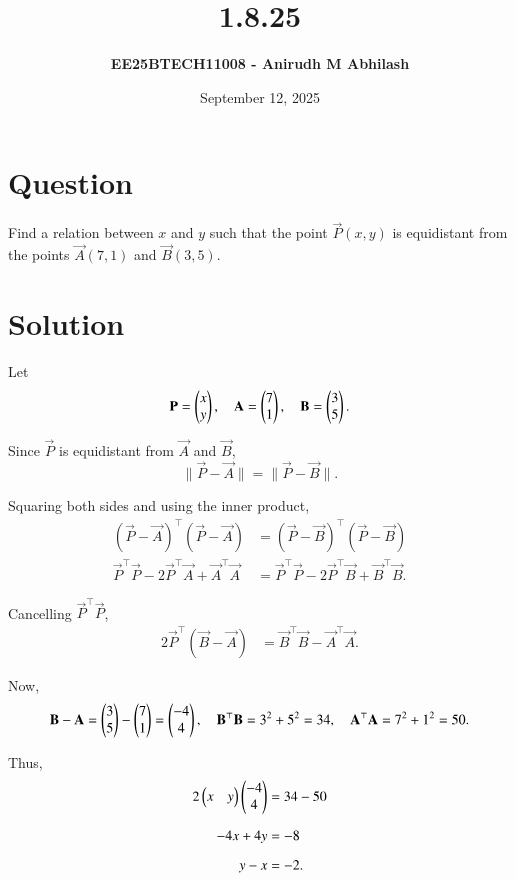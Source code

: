 \documentclass[12pt]{article}
\title{\textbf{1.8.25}}
\author{\textbf{EE25BTECH11008 - Anirudh M Abhilash}}
\date{September 12, 2025}
\begin{document}
\maketitle

\section*{Question}

Find a relation between $x$ and $y$ such that the point $\vec{P}(x,y)$ is equidistant from the points $\vec{A}(7,1)$ and $\vec{B}(3,5)$.

\section*{Solution}

Let 
\[
\mathbf{P} = \begin{pmatrix}x \\ y\end{pmatrix}, \quad \mathbf{A} = \begin{pmatrix}7 \\ 1\end{pmatrix}, \quad \mathbf{B} = \begin{pmatrix}3 \\ 5\end{pmatrix}.
\]

Since $\vec{P}$ is equidistant from $\vec{A}$ and $\vec{B}$,
\[
\|\vec{P} - \vec{A}\| = \|\vec{P} - \vec{B}\|.
\]

Squaring both sides and using the inner product,
\begin{align}
(\vec{P} - \vec{A})^\top(\vec{P} - \vec{A}) &= (\vec{P} - \vec{B})^\top(\vec{P} - \vec{B}) \\[6pt]
\vec{P}^\top \vec{P} - 2\vec{P}^\top \vec{A} + \vec{A}^\top \vec{A} 
&= \vec{P}^\top \vec{P} - 2\vec{P}^\top \vec{B} + \vec{B}^\top \vec{B}.
\end{align}

Cancelling $\vec{P}^\top \vec{P}$,
\begin{align}
2\vec{P}^\top(\vec{B}-\vec{A}) &= \vec{B}^\top \vec{B} - \vec{A}^\top \vec{A}.
\end{align}

Now,
\[
\mathbf{B} - \mathbf{A} = \begin{pmatrix}3 \\ 5\end{pmatrix} - \begin{pmatrix}7 \\ 1\end{pmatrix} = \begin{pmatrix}-4 \\ 4\end{pmatrix}, 
\quad \mathbf{B}^\top \mathbf{B} = 3^2 + 5^2 = 34, 
\quad \mathbf{A}^\top \mathbf{A} = 7^2 + 1^2 = 50.
\]

Thus,
\begin{align}
2\begin{pmatrix}x & y\end{pmatrix}\begin{pmatrix}-4 \\ 4\end{pmatrix} &= 34 - 50 \\[6pt]
-4x + 4y &= -8 \\[6pt]
y - x &= -2.
\end{align}
\end{document}
